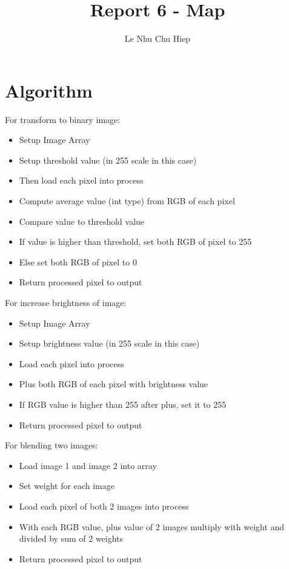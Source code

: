 \documentclass{article}
\title{Report 6 - Map}
\author{Le Nhu Chu Hiep}
\begin{document}
\maketitle

\section{Algorithm}

For transform to binary image:
\begin{itemize}
\item Setup Image Array
\item Setup threshold value (in 255 scale in this case)
\item Then load each pixel into process
\item Compute average value (int type) from RGB of each pixel
\item Compare value to threshold value
\item If value is higher than threshold, set both RGB of pixel to 255
\item Else set both RGB of pixel to 0
\item Return processed pixel to output
\end{itemize}

\hfill

\noindent For increase brightness of image:
\begin{itemize}
\item Setup Image Array
\item Setup brightness value (in 255 scale in this case)
\item Load each pixel into process
\item Plus both RGB of each pixel with brightness value
\item If RGB value is higher than 255 after plus, set it to 255
\item Return processed pixel to output
\end{itemize}

\hfill

\noindent For blending two images:
\begin{itemize}
\item Load image 1 and image 2 into array
\item Set weight for each image
\item Load each pixel of both 2 images into process
\item With each RGB value, plus value of 2 images multiply with weight and divided by sum of 2 weights
\item Return processed pixel to output
\end{itemize}
\end{document}
